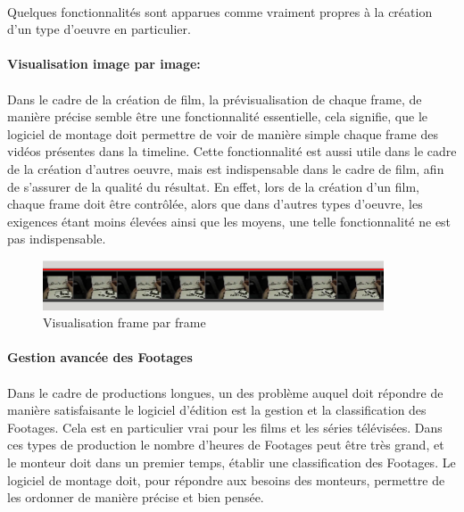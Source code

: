 \paragraph{}
Quelques fonctionnalités sont apparues comme vraiment propres à la création
d'un type d'oeuvre en particulier.

\paragraph{Visualisation image par image:}
\paragraph{}
Dans le cadre de la création de film, la prévisualisation de chaque frame,
de manière précise semble être une fonctionnalité essentielle,
cela signifie, que le logiciel de montage doit permettre de
voir de manière simple chaque frame des vidéos présentes dans la
timeline. Cette fonctionnalité est aussi utile dans le cadre de
la création d'autres oeuvre, mais est indispensable dans le cadre
de film, afin de s'assurer de la qualité du résultat. En effet,
lors de la création d'un film, chaque frame doit être contrôlée,
alors que dans d'autres types d'oeuvre, les exigences étant moins
élevées ainsi que les moyens, une telle fonctionnalité ne est pas
indispensable.

\begin{figure}
  \begin{center}
    \includegraphics[width=0.9\textwidth]{images/frameByFrame}
  \end{center} \caption{Visualisation frame par frame} \label{Yes}
\end{figure}

\paragraph{Gestion avancée des Footages}
\paragraph{}
Dans le cadre de productions longues, un des problème auquel doit répondre de
manière satisfaisante le logiciel d'édition est la gestion et la classification
des Footages. Cela est en particulier vrai pour les films et les séries télévisées.
Dans ces types de production le nombre d'heures de Footages peut être très grand, et
le monteur doit dans un premier temps, établir une classification
des Footages. Le logiciel de montage doit, pour répondre aux besoins des monteurs,
permettre de les ordonner de manière précise et bien pensée.

